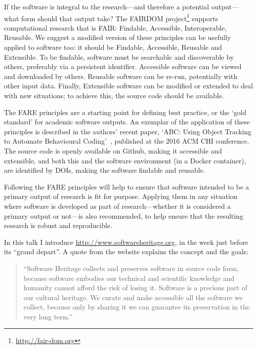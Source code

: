 \documentclass[a4paper,UKenglish]{dagrep}
\begin{document}
If the software is integral to the research---and therefore a potential output---what form should that output take? The FAIRDOM project\footnote{\url{http://fair-dom.org}} supports computational research that is FAIR: Findable, Accessible, Interoperable, Reusable. We suggest a modified version of these principles can be usefully applied to software too: it should be Findable, Accessible, Reusable and Extensible. To be findable, software must be searchable and discoverable by others, preferably via a persistent identifier. Accessible software can be viewed and downloaded by others. Reusable software can be re-run, potentially with other input data. Finally, Extensible software can be modified or extended to deal with new situations; to achieve this, the source code should be available.

The FARE principles are a starting point for defining best practice, or the `gold standard' for academic software outputs. An exemplar of the application of these principles is described in the authors' recent paper, `ABC: Using Object Tracking to Automate Behavioural Coding'~\cite{apaolaza_2016}, published at the 2016 ACM CHI conference. The source code is openly available on Github, making it accessible and extensible, and both this and the software environment (in a Docker container), are identified by DOIs, making the software findable and reusable.

Following the FARE principles will help to ensure that software intended to be a primary output of research is fit for purpose. Applying them in any situation where software is developed as part of research---whether it is considered a primary output or not---is also recommended, to help ensure that the resulting research is robust and reproducible.


 In this talk I introduce \url{http://www.softwareheritage.org}, in the week just before its ``grand depart''.  
A quote from the website explains the concept and the goals:
\begin{quote}
``Software Heritage collects and preserves software in source code form, because software embodies our technical and scientific knowledge and humanity cannot afford the risk of losing it.
Software is a precious part of our cultural heritage. We curate and make accessible all the software we collect, because only by sharing it we can guarantee its preservation in the very long term.''
\end{quote}
\end{document}

